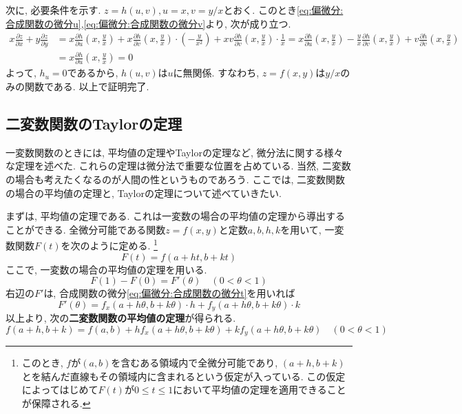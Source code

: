         次に, 必要条件を示す. $z=h(u,v),u=x,v=y/x$とおく. このとき\eqref{eq:偏微分:合成関数の微分u},\eqref{eq:偏微分:合成関数の微分v}より, 次が成り立つ.
        \begin{align*}
            x\frac{\partial z}{\partial x}+y\frac{\partial z}{\partial y}&=x\frac{\partial h}{\partial u}\left(x,\frac{y}{x}\right)+x\frac{\partial h}{\partial v}\left(x,\frac{y}{x}\right)\cdot \left(-\frac{y}{x^2}\right)+xv\frac{\partial h}{\partial v}\left(x,\frac{y}{x}\right)\cdot \frac{1}{x}=x\frac{\partial h}{\partial u}\left(x,\frac{y}{x}\right)-\frac{y}{x}\frac{\partial h}{\partial v}\left(x,\frac{y}{x}\right)+v\frac{\partial h}{\partial v}\left(x,\frac{y}{x}\right)\\
            &=x\frac{\partial h}{\partial u}\left(x,\frac{y}{x}\right)=0
        \end{align*}
        よって, $h_u=0$であるから, $h(u,v)$は$u$に無関係. すなわち, $z=f(x,y)$は$y/x$のみの関数である.
        以上で証明完了.
    \clearpage
    \subsection{二変数関数のTaylorの定理}
        一変数関数のときには, 平均値の定理やTaylorの定理など, 微分法に関する様々な定理を述べた. これらの定理は微分法で重要な位置を占めている. 当然, 二変数の場合も考えたくなるのが人間の性というものであろう. 
        ここでは, 二変数関数の場合の平均値の定理と, Taylorの定理について述べていきたい.

        まずは, 平均値の定理である. これは一変数の場合の平均値の定理から導出することができる. 全微分可能である関数$z=f(x,y)$と定数$a,b,h,k$を用いて, 一変数関数$F(t)$を次のように定める.
        \footnote{このとき, $f$が$(a,b)$を含むある領域内で全微分可能であり, $(a+h,b+k)$とを結んだ直線もその領域内に含まれるという仮定が入っている. この仮定によってはじめて$F(t)$が$0\leq t\leq 1$において平均値の定理を適用できることが保障される.}
        \begin{equation*}
            F(t)=f(a+ht,b+kt)
        \end{equation*}
        ここで, 一変数の場合の平均値の定理を用いる.
        \begin{equation*}
            F(1)-F(0)=F'(\theta)\quad(0<\theta<1)
        \end{equation*}
        右辺の$F'$は, 合成関数の微分\eqref{eq:偏微分:合成関数の微分t}を用いれば
        \begin{equation*}
            F'(\theta)=f_x(a+h\theta,b+k\theta)\cdot h+f_y(a+h\theta,b+k\theta)\cdot k
        \end{equation*}
        以上より, 次の\textbf{二変数関数の平均値の定理}が得られる.
        \begin{equation}
            f(a+h,b+k)=f(a,b)+hf_x(a+h\theta,b+k\theta)+kf_y(a+h\theta,b+k\theta) \quad (0<\theta<1) \label{eq:偏微分:二変数関数の平均値の定理}
        \end{equation}

